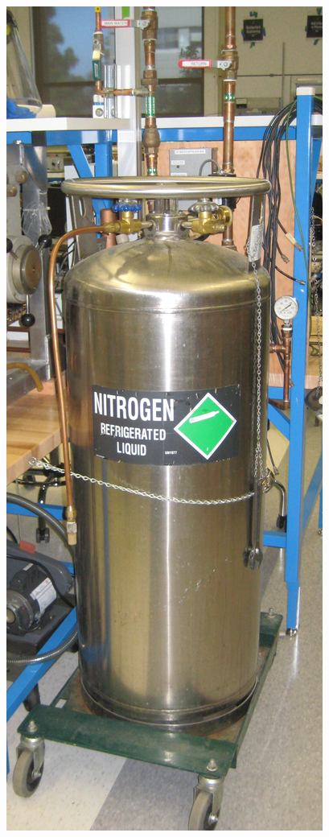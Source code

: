 \documentclass{../lab}
\begin{document}
\begin{figure}[H]
  \label{fig:Magnet_Backside_Polepieces_Crop_3307.jpg}
\endminipage\hfill
{}
  \href{http://experimentationlab.berkeley.edu/sites/default/files/images/SHE_LN-2_Crop_3542.jpg}{\includegraphics[width=\linewidth,keepaspectratio]{images/SHE_LN-2_Crop_3542.jpg}}

\end{figure}
\end{document}
